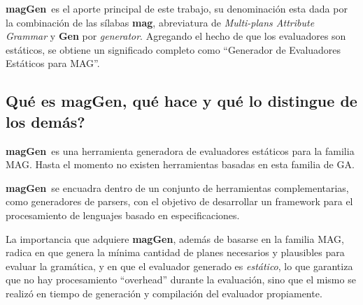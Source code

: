 \documentclass[runningheads,a4paper]{llncs}
\newcommand{\maggen}{\textbf{magGen}}
\begin{document}

\maggen\ es el aporte principal de este trabajo, su denominación esta dada por la combinación de las sílabas \textbf{mag}, abreviatura de \textit{Multi-plans Attribute Grammar} y \textbf{Gen} por \textit{generator}. Agregando el hecho de que los evaluadores son estáticos, se obtiene un significado completo como ``Generador de Evaluadores Estáticos para MAG''.

\subsection{\textquestiondown Qué es \maggen, qué hace y qué lo distingue de los demás?}

\maggen\ es una herramienta generadora de evaluadores estáticos para la familia MAG. Hasta el momento no existen herramientas basadas en esta familia de GA. 

\maggen\ se encuadra dentro de un conjunto de herramientas complementarias, como generadores de parsers, con el objetivo de desarrollar un framework para el procesamiento de lenguajes basado en especificaciones.

La importancia que adquiere \maggen, además de basarse en la familia MAG, radica en que genera la mínima cantidad de planes necesarios y plausibles para evaluar la gramática, y en que el evaluador generado es \textit{estático}, lo que garantiza que no hay procesamiento ``overhead'' durante la evaluación, sino que el mismo se realizó en tiempo de generación y compilación del evaluador propiamente.

%  

\end{document}
